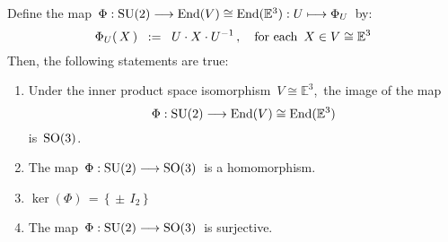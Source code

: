 \vskip 0.5cm
\noindent
\begin{proposition}
\mbox{}
\vskip 0.05cm
\noindent
Define the map
\,$\Phi : \textnormal{SU}(2) \longrightarrow \textnormal{End}(V) \cong \textnormal{End}(\mathbb{E}^{3}) : U \longmapsto \Phi_{U}$\,
by:
\begin{equation*}
\Phi_{U}(\,X\,)
\;\; := \;\;
	U \cdot X \cdot U^{-1}\,,
\quad
\textnormal{for each \,$X \in V \cong \mathbb{E}^{3}$}
\end{equation*}
Then, the following statements are true:
\begin{enumerate}
\item
	Under the inner product space isomorphism
	\,$V \cong \mathbb{E}^{3}$,\,
	the image of the map
	\begin{equation*}
	\Phi : \textnormal{SU}(2) \longrightarrow \textnormal{End}(V) \cong \textnormal{End}(\mathbb{E}^{3})
	\end{equation*}
	is \,$\textnormal{SO}(3)$.\,
\item
	The map \,$\Phi : \textnormal{SU}(2) \longrightarrow \textnormal{SO}(3)$\, is a homomorphism.
\item
	$\ker(\Phi) \, = \, \{\,\pm \, I_{2}\,\}$
\item
	The map \,$\Phi : \textnormal{SU}(2) \longrightarrow \textnormal{SO}(3)$\, is surjective.
\end{enumerate}
\end{proposition}
\proof
